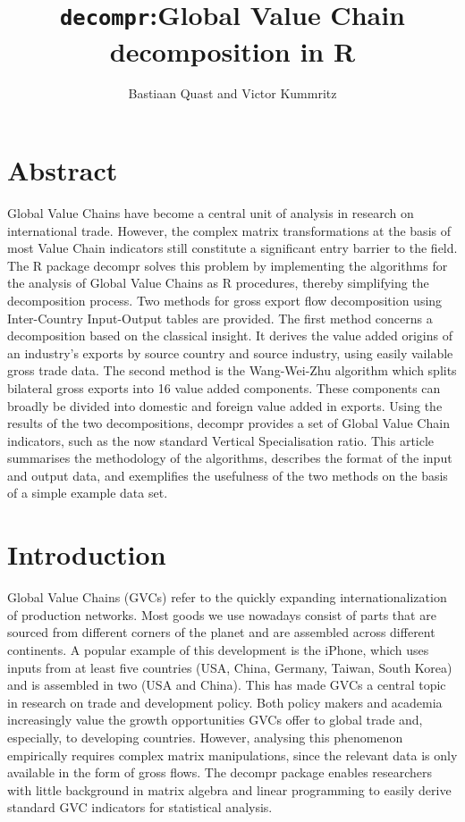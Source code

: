 \documentclass[a4paper]{article}\usepackage[]{graphicx}\usepackage[]{color}
\newcommand{\code}[1]{\texttt{#1}}
\begin{document}
\title{\code{decompr}:Global Value Chain decomposition in R}

\author{Bastiaan Quast and Victor Kummritz}
\maketitle

\section*{Abstract}

Global Value Chains have become a central unit of analysis in research
on international trade. However, the complex matrix transformations
at the basis of most Value Chain indicators still constitute a significant
entry barrier to the field. The R package decompr solves this problem
by implementing the algorithms for the analysis of Global Value Chains
as R procedures, thereby simplifying the decomposition process. Two
methods for gross export flow decomposition using Inter-Country Input-Output
tables are provided. The first method concerns a decomposition based
on the classical \citet{wale36} insight. It derives the value added
origins of an industry's exports by source country and source industry,
using easily vailable gross trade data. The second method is the Wang-Wei-Zhu
algorithm which splits bilateral gross exports into 16 value added
components. These components can broadly be divided into domestic
and foreign value added in exports. Using the results of the two decompositions,
decompr provides a set of Global Value Chain indicators, such as the
now standard Vertical Specialisation ratio. This article summarises
the methodology of the algorithms, describes the format of the input
and output data, and exemplifies the usefulness of the two methods
on the basis of a simple example data set. 

\section{Introduction}

Global Value Chains (GVCs) refer to the quickly expanding internationalization
of production networks. Most goods we use nowadays consist of parts
that are sourced from different corners of the planet and are assembled
across different continents. A popular example of this development
is the iPhone, which uses inputs from at least five countries (USA,
China, Germany, Taiwan, South Korea) and is assembled in two (USA
and China). This has made GVCs a central topic in research on trade
and development policy. Both policy makers and academia increasingly
value the growth opportunities GVCs offer to global trade and, especially,
to developing countries. However, analysing this phenomenon empirically
requires complex matrix manipulations, since the relevant data is
only available in the form of gross flows. The decompr package enables
researchers with little background in matrix algebra and linear programming
to easily derive standard GVC indicators for statistical analysis.
\end{document}
